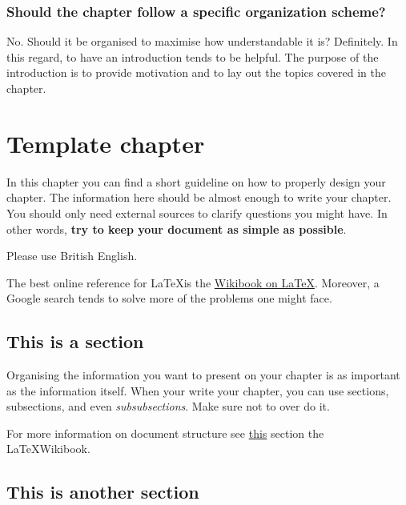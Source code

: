 \documentclass[11pt,a4paper,oneside]{book}
\newcommand{\latex}{\LaTeX{}} %
\begin{document}
\subsection*{Should the chapter follow a specific organization scheme?}
No. Should it be organised to maximise how understandable it is? Definitely. In this regard, to have an introduction tends to be helpful. The purpose of the introduction is to provide motivation and to lay out the topics covered in the chapter.



\newpage
\tableofcontents
\listoffigures
\listoftables

\mainmatter

\chapter{Template chapter}
\label{ch:template_chapter}
In this chapter you can find a short guideline on how to properly design your chapter. The information here should be almost enough to write your chapter. You should only need external sources to clarify questions you might have. In other words, \textbf{try to keep your document as simple as possible}.

Please use British English.

The best online reference for \latex is the \href{https://en.wikibooks.org/wiki/LaTeX}{Wikibook on \latex}. Moreover, a Google search tends to solve more of the problems one might face.

\section{This is a section}
\label{sec:document_structure}
Organising the information you want to present on your chapter is as important as the information itself. When your write your chapter, you can use sections, subsections, and even \textit{subsubsections}. Make sure not to over do it.

For more information on document structure see \href{https://en.wikibooks.org/wiki/LaTeX/Document_Structure}{this} section the \latex Wikibook.
\section{This is another section}
\end{document}
